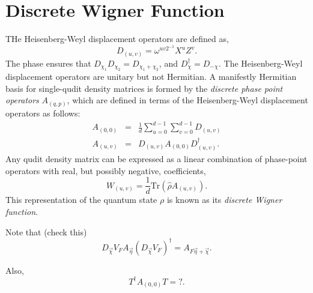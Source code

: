 \documentclass{article}
\begin{document}
\section{Discrete Wigner Function}
THe Heisenberg-Weyl displacement operators are defined as, \begin{equation}
 D_{(u,v)} = \omega^{uv2^{-1}}X^uZ^v.
\end{equation}
The phase ensures that $D_{\chi_1}D_{\chi_2} = D_{\chi_1+\chi_2}$, and $D_\chi^\dagger = D_{-\chi}$.
The Heisenberg-Weyl displacement operators are unitary but not Hermitian. A manifestly Hermitian basis for single-qudit density matrices is formed by the \textit{discrete phase point operators} $A_{(q,p)}$, which are defined in terms of the Heisenberg-Weyl displacement operators as follows: 
\begin{eqnarray}
A_{(0,0)}&=&\frac{1}{d}\sum_{u=0}^{d-1}\sum_{v=0}^{d-1}  D_{(u,v)} \\ A_{(u,v)}&=&  D_{(u,v)}A_{(0,0)} D_{(u,v)}^\dagger. \label{phase-point-def}
\end{eqnarray}
Any qudit density matrix can be expressed as a linear combination of phase-point operators with real, but possibly negative, coefficients, 
\begin{equation}
W_{(u,v)}=\frac{1}{d} \text{Tr}(\hat\rho A_{(u,v)}).
\end{equation}
This representation of the quantum state $\rho$ is known as its \textit{discrete Wigner function}.

Note that (check this)
\begin{equation}
    D_{\vec \chi} V_F A_{\vec{\eta}} (D_{\vec \chi} V_F)^\dagger
    = A_{F \vec \eta+ \vec \chi}.
\end{equation}

Also,
\begin{equation}
    T
    ^\dagger A_{(0,0)} T
    = ?.
\end{equation}
\end{document}
